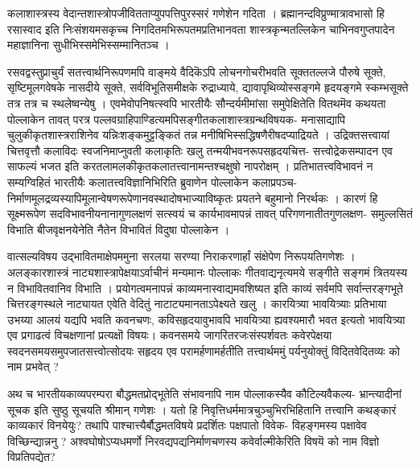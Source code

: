 \newpage

{\dev कलाशास्त्रस्य वेदान्तशास्त्रोपजीवितताप्युपपत्तिपुरस्सरं गणेशेन गदिता । ब्रह्मानन्दविप्रुण्मात्रा\-वभासो हि रसास्वाद इति निःसंशयमसकृच्च निगदितमभिरूपतमप्रतिभानवता शास्त्रकृन्मत\-ल्लिकेन चाभिनवगुप्तपादेन महाज्ञानिना सुधीभिस्समेभिस्सम्मानितञ्च ।}

{\dev रसवद्वस्तुप्राचुर्यं सतत्त्वार्थनिरूपणमपि वाङ्मये वैदिकॆऽपि लोचनगोचरीभवति सूक्ततल्लजे पौरुषे सूक्ते, सृष्टिमूलगवेषके नासदीये सूक्ते, सर्वविभूतिसमीक्षके रुद्राध्याये, द्यावापृथिव्योस्स\-ङ्गमे हृदयङ्गमे स्कम्भसूक्ते तत्र तत्र च स्थलेष्वन्येषु । एवमेवोपनिषत्स्वपि भारतीयैः सौन्दर्य\-मीमांसा समुपेक्षितेति वितथमॆव कथयता पोल्लाकेन तावत् परत्र पल्लवग्राहिपाण्डित्यमपि\break  सङ्गीतकलाशास्त्रग्रन्थविषयक- मनासाद्यापि चुलुकीकृतशास्त्रराशिनेव यन्निःशङ्कमुट्टङ्कितं तन्न मनीषिभिस्सद्धिषणैरीषदप्याद्रियते । उद्रिक्तसत्त्वायां चित्तवृत्तौ कलाविदः स्वजनिमाप्नुवती कलाकृतिः खलु तन्मयीभवनरूपसहृदयचित्त- सत्त्वोद्रेकसम्पादन एव साफल्यं भजत इति करतलामलकीकृतकलातत्त्वानामन्तश्चक्षुषो नापरोक्षम् । प्रतिभातत्त्वविभावनं न सम्यग्विहितं भारतीयैः कलातत्त्वविज्ञानिभिरिति ब्रुवाणेन पोल्लाकेन कलाप्रपञ्च- निर्माणमूलद्रव्यस्यापि\break मूलान्वेषणरूपेणानवस्थादोषभाज्याविष्कृतः प्रयतने बहुमानो निरर्थकः । कारणं हि सूक्ष्मरूपेण सदविभावनीयनानागुणलक्षणं सत्स्वयं च कार्यभावमापन्नं तावत् परिगणनातीतगुणलक्षण- समुल्लसितं विभाति बीजवृक्षनयेनेति नैतेन विभावितं विदुषा पोल्लाकेन ।}

{\dev वात्सल्यविषय उद्भावितमाक्षेपममुना सरलया सरण्या निराकरणार्हां संक्षेपेण निरूपयति\break गणेशः । अलङ्कारशास्त्रं नाट्यशास्त्रापेक्षयाऽर्वाचीनं मन्यमानः पोल्लाकः गीतवाद्यनृत्यमये सङ्गीते सङ्गमं त्रितयस्य न विभावितवानिव विभाति । प्रयोगत्वमनापन्नं काव्यमनास्वाद्यमव\-शिष्यत इति काव्यं सर्वमपि सर्वान्तरङ्गभूते चित्तरङ्गस्थले नाट्यायत एवेति वेदितुं नाटाट्यमानताऽपेक्ष्यते खलु । कारयित्र्या भावयित्र्याः प्रतिभाया उभय्या आलयं यद्यपि भवति कवनचणः, कविसहृदयावुभावपि भावयित्र्या ह्यवश्यमारौ भवत इत्यतो भावयित्र्या एव प्रगाढत्वं विचक्षणानां प्रत्यक्षॊ विषयः। कवनसमये जागरितरजःसंस्पर्शवतः कवेरपेक्षया स्वदनसमयसमुपजातसत्त्वोत्सोदयः सहृदय एव परामर्हणामर्हतीति तत्त्वार्थममुं पर्यनुयोक्तुं विदितवेदितव्यः को नाम प्रभवेत् ?}

{\dev अथ च भारतीयकाव्यपरम्परा बौद्धमतप्रोद्भूतेति संभावनापि नाम पोल्लाकस्यैव कौटिल्यवैकल्य- भ्रान्त्यादीनां सूचक इति सुष्ठु सूचयति श्रीमान् गणेशः । यतो हि निवृत्तिधर्ममात्रचुञ्चुभिरभि\-हितानि तत्त्वानि कथङ्कारं काव्यकारं विनयेयुः? तथापि पाश्चात्त्यैर्बौद्धमतविषये प्रदर्शितः पक्षपातो विवेक- विहङ्गमस्य पक्षावेव विच्छिन्द्यान्ननु ? अश्वघोषोऽप्यधमर्णो निरवद्यपद्य\-निर्माणचणस्य कवेर्वाल्मीकेरिति विषयॆ को नाम विज्ञो विप्रतिपद्येत?}

